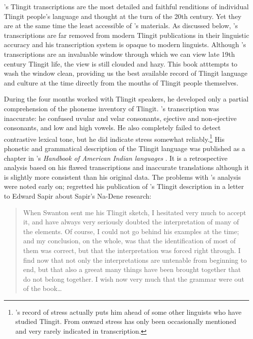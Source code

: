 \citeauthor{swanton:1909}’s Tlingit transcriptions are the most detailed and faithful renditions of individual Tlingit people’s language and thought at the turn of the 20th century.
Yet they are at the same time the least accessible of \citeauthor{swanton:1909}’s materials.
As discussed below, \citeauthor{swanton:1909}’s transcriptions are far removed from modern Tlingit publications in their linguistic accuracy and his transcription system is opaque to modern linguists.
Although \citeauthor{swanton:1909}’s transcriptions are an invaluable window through which we can view late 19th century Tlingit life, the view is still clouded and hazy.
This book atttempts to wash the window clean, providing us the best available record of Tlingit language and culture at the time directly from the mouths of Tlingit people themselves.

During the four months \citeauthor{swanton:1909} worked with Tlingit speakers, he developed only a partial comprehension of the phoneme inventory of Tlingit.
\citeauthor{swanton:1909}’s transcription was inaccurate: he confused uvular and velar consonants, ejective and non-ejective consonants, and low and high vowels.
He also completely failed to detect contrastive lexical tone, but he did indicate stress somewhat reliably.\footnote{\citeauthor{swanton:1909}’s record of stress actually puts him ahead of some other linguists who have studied Tlingit.
From \textcite{boas:1917} onward stress has only been occasionally mentioned and very rarely indicated in transcription.} His phonetic and grammatical description of the Tlingit language was published as a chapter in \citeauthor{boas:1911}’s \textit{Handbook of American Indian languages} \parencite{swanton:1911}.
It is a retrospective analysis based on his flawed transcriptions and inaccurate translations although it is slightly more consistent than his original data.
The problems with \citeauthor{swanton:1909}’s analysis were noted early on; \citeauthor{boas:1913a} regretted his publication of \citeauthor{swanton:1909}’s Tlingit description in a letter to Edward Sapir about Sapir’s Na-Dene research:

\begin{quote}\small
When Swanton sent me his Tlingit sketch, I hesitated very much to accept it, and have always very seriously doubted the interpretation of many of the elements.
Of course, I could not go behind his examples at the time; and my conclusion, on the whole, was that the identification of most of them was correct, but that the interpretation was forced right through.
I find now that not only the interpretations are untenable from beginning to end, but that also a greeat many things have been brought together that do not belong together.
I wish now very much that the grammar were out of the book…
\end{quote}

